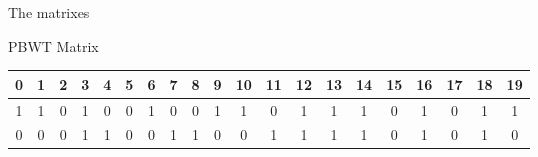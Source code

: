 \documentclass{beamer}
\begin{document}
\begin{frame}{The matrixes}
\begin{block}{PBWT Matrix}
\begin{table}[H]
                                                                                                                                                                                                                                                                                                                                                                                                                              \begin{tabular}{c|c|c|c|c|c|c|c|c|c|c|c|c|c|c|c|c|c|c|c}
                                                                                                                                                                                                                                                                                                                                                                                                                              \hline
                                                                                                                                                                                                                                                                                                                                                                                                                              0 & 1 & 2 & 3 & 4 & 5 & 6 & 7 & 8 & 9 & 10 & 11 & 12 & 13 & 14 & 15 & 16
                                                                                                                                                                                                                                                                                                                                                                                                                                                                                                                                                                                              & 17 & 18 & 19\\
                    \hline
                    \hline
                    1 & 1 & 0 & 1 & 0 & 0 & 1 & 0 & 0 & 1 & 1 & 0 & 1 & 1 & 1 & 0 & 1 & 0
                                                                                                                                                                                                       & 1 & 1 \\
                    0 & 0 & 0 & 1 & 1 & 0 & 0 & 1 & 1 & 0 & 0 & 1 & 1 & 1 & 1 & 0 & 1 & 0
                                                                                                                                                                                                       & 1 & 0 \\

\end{tabular}
\end{table}
\end{block}
\end{frame}
\end{document}
